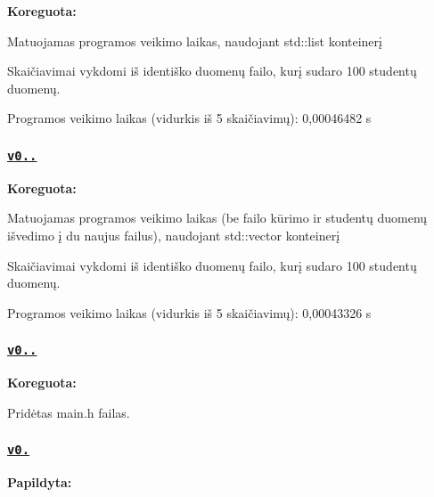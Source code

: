{\bfseries Koreguota\+:}


\begin{DoxyItemize}
\item Matuojamas programos veikimo laikas, naudojant {\ttfamily std\+::list} konteinerį
\item Skaičiavimai vykdomi iš identiško duomenų failo, kurį sudaro 100 studentų duomenų. 
\begin{DoxyCode}
Programos veikimo laikas (vidurkis iš 5 skaičiavimų): 0,00046482 s
\end{DoxyCode}
 \subsubsection*{\href{https://github.com/KlauMack/Duomenu_apdorojimas/releases/tag/v0.5.1}{\tt v0..}}
\end{DoxyItemize}

{\bfseries Koreguota\+:}


\begin{DoxyItemize}
\item Matuojamas programos veikimo laikas (be failo kūrimo ir studentų duomenų išvedimo į du naujus failus), naudojant {\ttfamily std\+::vector} konteinerį
\item Skaičiavimai vykdomi iš identiško duomenų failo, kurį sudaro 100 studentų duomenų. 
\begin{DoxyCode}
Programos veikimo laikas (vidurkis iš 5 skaičiavimų): 0,00043326 s
\end{DoxyCode}
 \subsubsection*{\href{https://github.com/KlauMack/Duomenu_apdorojimas/releases/tag/v0.4.1}{\tt v0..}}
\end{DoxyItemize}

{\bfseries Koreguota\+:}


\begin{DoxyItemize}
\item Pridėtas {\ttfamily main.\+h} failas.
\end{DoxyItemize}

\subsubsection*{\href{https://github.com/KlauMack/Duomenu_apdorojimas/releases/tag/v0.4}{\tt v0.}}

{\bfseries Papildyta\+:}


